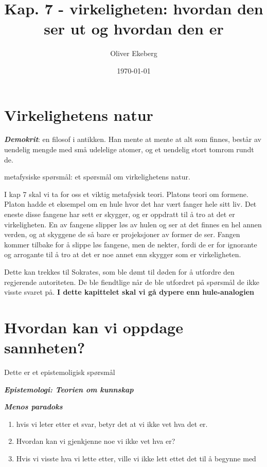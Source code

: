 \documentclass[11pt, a4paper]{article}
\title{Kap. 7 - virkeligheten: hvordan den ser ut og hvordan den er}
\author{Oliver Ekeberg}
\date{\today}
\begin{document}
\maketitle

\tableofcontents


\section{Virkelighetens natur}


\textbf{\textit{Demokrit}}: en filosof i antikken. Han mente at mente at alt som finnes, består av uendelig mengde med små udelelige atomer, og et uendelig stort tomrom rundt de.

metafysiske spørsmål: et spørsmål om virkelighetens natur.



I kap 7 skal vi ta for oss et viktig metafysisk teori. Platons teori om formene. Platon hadde et eksempel om en hule hvor det har vært fanger hele sitt liv. Det eneste disse fangene har sett er skygger, og er oppdratt til å tro at det er virkeligheten. En av fangene slipper løs av hulen og ser at det finnes en hel annen verden, og at skyggene de så bare er projeksjoner av former de ser. Fangen kommer tilbake for å slippe løs fangene, men de nekter, fordi de er for ignorante og arrogante til å tro at det er noe annet enn skygger som er virkeligheten.

Dette kan trekkes til Sokrates, som ble dømt til døden for å utfordre den regjerende autoriteten. De ble fiendtlige når de ble utfordret på spørsmål de ikke visste svaret på. \textbf{I dette kapittelet skal vi gå dypere enn hule-analogien}


\section{Hvordan kan vi oppdage sannheten?}


Dette er et epistemoligisk spørsmål

\textbf{\textit{Epistemologi: Teorien om kunnskap}}

\textbf{\textit{Menos paradoks}}
\begin{enumerate}
    \item hvis vi leter etter et svar, betyr det at vi ikke vet hva det er.
    \item Hvordan kan vi gjenkjenne noe vi ikke vet hva er?
    \item Hvis vi visste hva vi lette etter, ville vi ikke lett ettet det til å begynne med
\end{enumerate}
\end{document}
